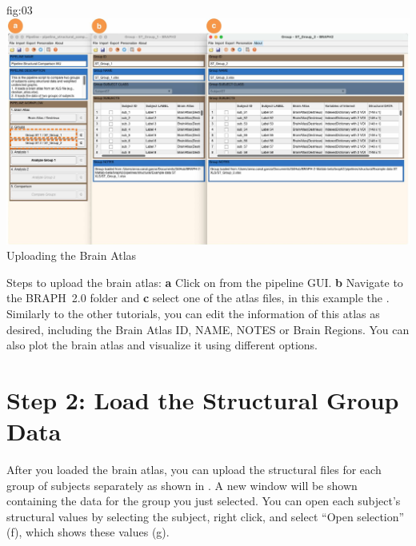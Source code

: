 \documentclass[justified]{tufte-handout}
\begin{document}
{
	{fig:03}
	{
	\includegraphics{fig03.jpg}
	}
	{Uploading the Brain Atlas}
	{
	Steps to upload the brain atlas:
	{\bf a} Click on  from the pipeline GUI.
	{\bf b} Navigate to the BRAPH~2.0 folder  and {\bf c} select one of the atlas files, in this example the . Similarly to the other tutorials, you can edit the information of this atlas as desired, including the Brain Atlas ID, NAME, NOTES or Brain Regions. You can also plot the brain atlas and visualize it using different options.

\section{Step 2: Load the Structural Group Data}

After you loaded the brain atlas, you can upload the structural files for each group of subjects separately as shown in . A new window will be shown containing the data for the group you just selected. You can open each subject’s structural values by selecting
the subject, right click, and select “Open selection” (f), which shows these values (g). 
	
}}
\end{document}
